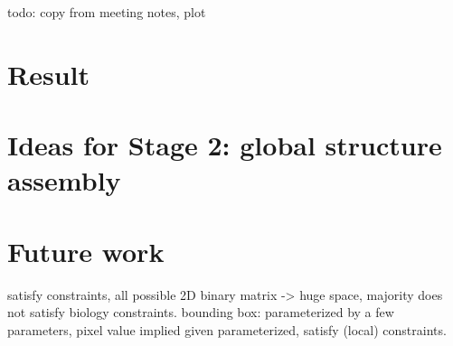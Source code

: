 \documentclass[12pt]{article}
\begin{document}
todo: copy from meeting notes, plot

\section{Result}

\section{Ideas for Stage 2: global structure assembly}


\section{Future work}

satisfy constraints,
all possible 2D binary matrix -> huge space, majority does not satisfy biology constraints.
bounding box: parameterized by a few parameters,
pixel value implied given parameterized, satisfy (local) constraints.






\end{document}
